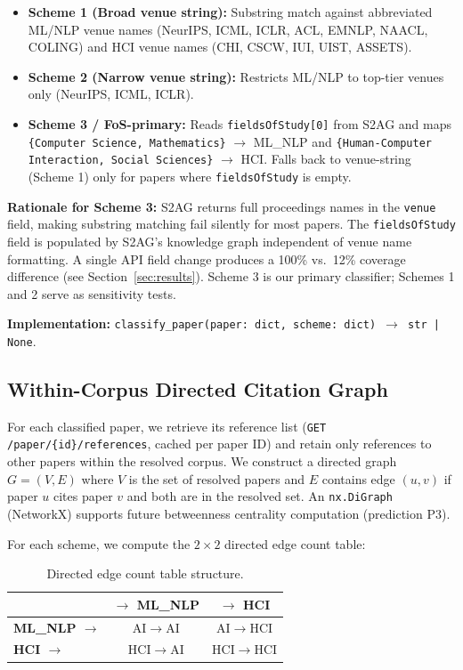 \begin{itemize}
\item \textbf{Scheme 1 (Broad venue string):} Substring match against abbreviated ML/NLP venue names (NeurIPS, ICML, ICLR, ACL, EMNLP, NAACL, COLING) and HCI venue names (CHI, CSCW, IUI, UIST, ASSETS).
\item \textbf{Scheme 2 (Narrow venue string):} Restricts ML/NLP to top-tier venues only (NeurIPS, ICML, ICLR).
\item \textbf{Scheme 3 / FoS-primary:} Reads \texttt{fieldsOfStudy[0]} from S2AG and maps \texttt{\{Computer Science, Mathematics\}} $\to$ ML\_NLP and \texttt{\{Human-Computer Interaction, Social Sciences\}} $\to$ HCI. Falls back to venue-string (Scheme 1) only for papers where \texttt{fieldsOfStudy} is empty.
\end{itemize}

\textbf{Rationale for Scheme 3:} S2AG returns full proceedings names in the \texttt{venue} field, making substring matching fail silently for most papers.
The \texttt{fieldsOfStudy} field is populated by S2AG's knowledge graph independent of venue name formatting.
A single API field change produces a 100\% vs.\ 12\% coverage difference (see Section~\ref{sec:results}).
Scheme 3 is our primary classifier; Schemes 1 and 2 serve as sensitivity tests.

\textbf{Implementation:} \texttt{classify\_paper(paper: dict, scheme: dict) $\to$ str | None}.

\subsection{Within-Corpus Directed Citation Graph}

For each classified paper, we retrieve its reference list (\texttt{GET /paper/\{id\}/references}, cached per paper ID) and retain only references to other papers within the resolved corpus.
We construct a directed graph $G = (V, E)$ where $V$ is the set of resolved papers and $E$ contains edge $(u, v)$ if paper $u$ cites paper $v$ and both are in the resolved set.
An \texttt{nx.DiGraph} (NetworkX) supports future betweenness centrality computation (prediction P3).

For each scheme, we compute the $2\times2$ directed edge count table:

\begin{table}[h]
\centering
\caption{Directed edge count table structure.}
\begin{tabular}{lcc}
\toprule
 & $\to$ ML\_NLP & $\to$ HCI \\
\midrule
\textbf{ML\_NLP $\to$} & AI$\to$AI & AI$\to$HCI \\
\textbf{HCI $\to$} & HCI$\to$AI & HCI$\to$HCI \\
\bottomrule
\end{tabular}
\end{table}

